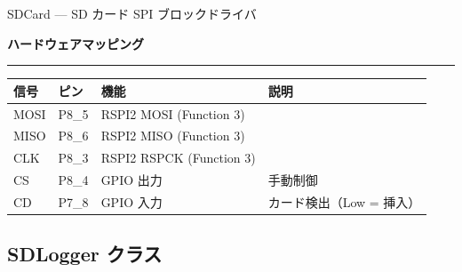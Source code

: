 \documentclass[a4paper,11pt,dvipdfmx]{jsarticle}
\makeatletter
\newcommand{\apisection}[1]{%
  \par\addvspace{4mm}%
  {\normalsize\bfseries\color{headerblue} #1}%
  \par\vspace{-1mm}%
  {\color{accentblue!40}\rule{\linewidth}{0.5pt}}%
  \par\nobreak\vspace{2mm}%
  \@afterheading
}
\makeatother
\begin{document}
\begin{apibox}{SDCard --- SD カード SPI ブロックドライバ}
\apisection{ハードウェアマッピング}

\begin{tabularx}{\textwidth}{l l l X}
\toprule
\textbf{信号} & \textbf{ピン} & \textbf{機能} & \textbf{説明} \\
\midrule
MOSI & P8\_5 & RSPI2 MOSI (Function 3)  & \\
MISO & P8\_6 & RSPI2 MISO (Function 3)  & \\
CLK  & P8\_3 & RSPI2 RSPCK (Function 3) & \\
CS   & P8\_4 & GPIO 出力 & 手動制御 \\
CD   & P7\_8 & GPIO 入力 & カード検出（Low = 挿入） \\
\bottomrule
\end{tabularx}

\end{apibox}

\subsection{SDLogger クラス}\label{sec:api-sdlogger}
\end{document}
